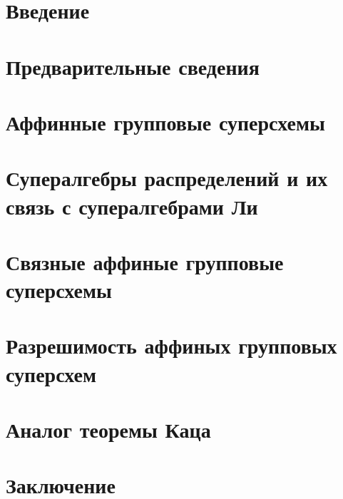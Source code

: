 \documentclass[a4paper,12pt]{article}
\begin{document}
  
  \setcounter{page}{2}

  \section*{Введение}
    
  
  \newpage

  \tableofcontents

  \newpage
  \section{Предварительные сведения}
    

  \newpage
  \section{Аффинные групповые суперсхемы}
    

  \newpage
  \section{Супералгебры распределений и их связь с супералгебрами Ли}
    

  \newpage
  \section{Связные аффиные групповые суперсхемы}
    

  \newpage
  \section{Разрешимость аффиных групповых суперсхем}
    

  \newpage
  \section{Аналог теоремы Каца}
    
 
  \newpage
  \section*{Заключение}
    

  
\end{document}
